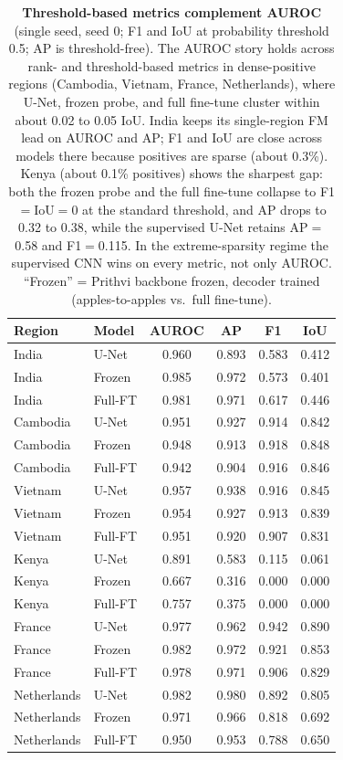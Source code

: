 \documentclass{article}
\begin{document}
\begin{table}[h]\centering\small
\caption{\textbf{Threshold-based metrics complement AUROC} (single seed, seed 0; F1
and IoU at probability threshold 0.5; AP is threshold-free). The AUROC story holds
across rank- and threshold-based metrics in dense-positive regions (Cambodia,
Vietnam, France, Netherlands), where U-Net, frozen probe, and full fine-tune cluster
within about 0.02 to 0.05 IoU. India keeps its single-region FM lead on AUROC and
AP; F1 and IoU are close across models there because positives are sparse (about
0.3\%). Kenya (about 0.1\% positives) shows the sharpest gap: both the frozen probe
and the full fine-tune collapse to F1$=$IoU$=$0 at the standard threshold, and AP
drops to 0.32 to 0.38, while the supervised U-Net retains AP$=$0.58 and F1$=$0.115.
In the extreme-sparsity regime the supervised CNN wins on every
metric, not only AUROC. ``Frozen'' = Prithvi backbone
frozen, decoder trained (apples-to-apples vs.\ full fine-tune).}
\label{tab:xmetrics}
\begin{tabular}{llcccc}
\toprule
Region & Model & AUROC & AP & F1 & IoU \\
\midrule
India       & U-Net   & 0.960 & 0.893 & 0.583 & 0.412 \\
India       & Frozen  & 0.985 & 0.972 & 0.573 & 0.401 \\
India       & Full-FT & 0.981 & 0.971 & 0.617 & 0.446 \\
\midrule
Cambodia    & U-Net   & 0.951 & 0.927 & 0.914 & 0.842 \\
Cambodia    & Frozen  & 0.948 & 0.913 & 0.918 & 0.848 \\
Cambodia    & Full-FT & 0.942 & 0.904 & 0.916 & 0.846 \\
\midrule
Vietnam     & U-Net   & 0.957 & 0.938 & 0.916 & 0.845 \\
Vietnam     & Frozen  & 0.954 & 0.927 & 0.913 & 0.839 \\
Vietnam     & Full-FT & 0.951 & 0.920 & 0.907 & 0.831 \\
\midrule
Kenya       & U-Net   & 0.891 & 0.583 & 0.115 & 0.061 \\
Kenya       & Frozen  & 0.667 & 0.316 & 0.000 & 0.000 \\
Kenya       & Full-FT & 0.757 & 0.375 & 0.000 & 0.000 \\
\midrule
France      & U-Net   & 0.977 & 0.962 & 0.942 & 0.890 \\
France      & Frozen  & 0.982 & 0.972 & 0.921 & 0.853 \\
France      & Full-FT & 0.978 & 0.971 & 0.906 & 0.829 \\
\midrule
Netherlands & U-Net   & 0.982 & 0.980 & 0.892 & 0.805 \\
Netherlands & Frozen  & 0.971 & 0.966 & 0.818 & 0.692 \\
Netherlands & Full-FT & 0.950 & 0.953 & 0.788 & 0.650 \\
\bottomrule
\end{tabular}
\end{table}
\end{document}
